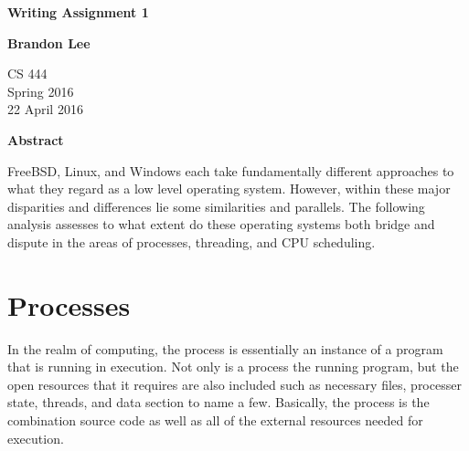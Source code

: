 \documentclass[letterpaper,10pt,titlepage]{article}
\begin{document}
\begin{titlepage}
    \begin{center}
        \vspace*{3.5cm}

        \textbf{Writing Assignment 1}

        \vspace{0.5cm}

        \textbf{Brandon Lee}

        \vspace{0.8cm}

        CS 444\\
        Spring 2016\\
        22 April 2016\\

        \vspace{1cm}

        \textbf{Abstract}\\

        \vspace{0.5cm}

        FreeBSD, Linux, and Windows each take fundamentally different approaches to what they regard as a low level operating system.  However, within these major disparities and differences lie some similarities and parallels.  The following analysis assesses to what extent do these operating systems both bridge and dispute in the areas of processes, threading, and CPU scheduling.


        \vfill



    \end{center}
\end{titlepage}

\newpage

\tableofcontents

\newpage

\section{Processes}

In the realm of computing, the process is essentially an instance of a program that is running in execution.  Not only is a process the running program, but the open resources that it requires are also included such as necessary files, processer state, threads, and data section to name a few.  Basically, the process is the combination source code as well as all of the external resources needed for execution.
\end{document}
